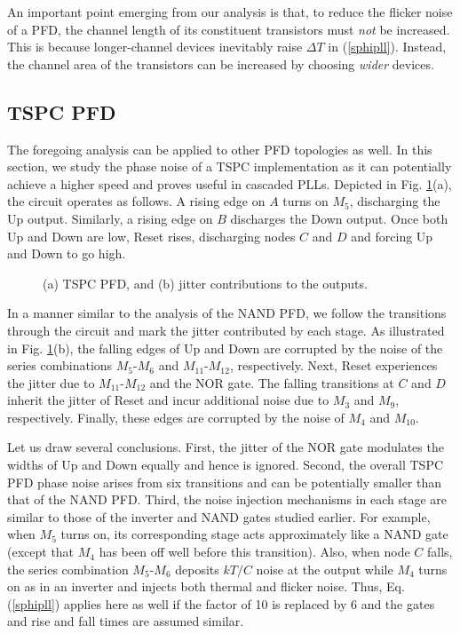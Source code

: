 An important point emerging from our analysis is that, to reduce the flicker noise of a PFD, the channel length
of its constituent transistors must {\em not} be increased. This is because longer-channel devices inevitably raise
$\Delta T$ in (\ref{sphipll}). Instead, the channel area of the transistors can be increased by choosing {\em
wider} devices.

\subsection{TSPC PFD}
The foregoing analysis can be applied to other PFD topologies as well. In this section, we study the phase noise of a TSPC
implementation \cite{tspcpfd} as it can potentially achieve a higher speed and proves useful in cascaded PLLs. Depicted in Fig.
\ref{pfdtspc}(a), the circuit operates as follows. A rising edge on $A$ turns on $M_5$, discharging the Up output. Similarly,
a rising edge on $B$ discharges the Down output. Once both Up and Down are low, Reset rises, discharging nodes
$C$ and $D$ and forcing Up and Down to go high.
\begin{figure}[htb]
\vspace{5.4in}
\caption{(a) TSPC PFD, and (b) jitter contributions to the outputs.}
\label{pfdtspc}
\end{figure}

In a manner similar to the analysis of the NAND PFD, we follow the transitions through the circuit and mark the jitter
contributed by each stage. As illustrated in Fig. \ref{pfdtspc}(b), the falling edges of Up and Down are corrupted by the
noise of the series combinations $M_5$-$M_6$ and $M_{11}$-$M_{12}$, respectively. Next, Reset experiences the jitter
due to $M_{11}$-$M_{12}$ and the NOR gate. The falling transitions at $C$ and $D$ inherit the jitter of Reset and incur
additional noise due to $M_3$ and $M_9$, respectively. Finally, these edges are corrupted by the noise of $M_4$ and
$M_{10}$.

Let us draw several conclusions. First, the jitter of the NOR gate modulates the widths of Up and Down equally and hence
is ignored. Second, the overall TSPC PFD phase noise arises from six transitions and can be potentially smaller than that
of the NAND PFD. Third, the noise injection mechanisms in each stage are similar to those of the inverter and NAND gates
studied earlier. For example, when $M_5$ turns on, its corresponding stage acts approximately like a NAND gate (except
that $M_4$ has been off well before this transition). Also, when node $C$ falls, the series combination 
$M_5$-$M_6$ deposits $kT/C$ noise at the output while $M_4$ turns on as in an inverter and injects both thermal and
flicker noise. Thus, Eq. (\ref{sphipll}) applies here as well if the factor of 10 is replaced by 6 and the gates and rise and fall times are assumed
similar.








